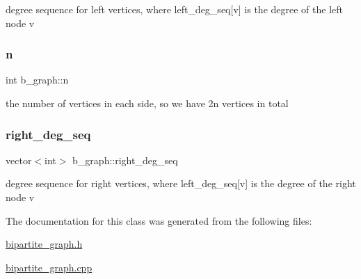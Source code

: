 degree sequence for left vertices, where left\+\_\+deg\+\_\+seq\mbox{[}v\mbox{]} is the degree of the left node v 

\mbox{\label{classb__graph_a9e211d40c1799bc9b125de472ff06642}} 
\subsubsection{\texorpdfstring{n}{n}}
{\footnotesize\ttfamily int b\+\_\+graph\+::n\hspace{0.3cm}{\ttfamily [private]}}



the number of vertices in each side, so we have 2n vertices in total 

\mbox{\label{classb__graph_ae4c875ed6a583a78f38dfe958f20fad5}} 
\subsubsection{\texorpdfstring{right\+\_\+deg\+\_\+seq}{right\_deg\_seq}}
{\footnotesize\ttfamily vector$<$int$>$ b\+\_\+graph\+::right\+\_\+deg\+\_\+seq\hspace{0.3cm}{\ttfamily [private]}}



degree sequence for right vertices, where left\+\_\+deg\+\_\+seq\mbox{[}v\mbox{]} is the degree of the right node v 



The documentation for this class was generated from the following files\+:\begin{DoxyCompactItemize}
\item 
\hyperlink{bipartite__graph_8h}{bipartite\+\_\+graph.\+h}\item 
\hyperlink{bipartite__graph_8cpp}{bipartite\+\_\+graph.\+cpp}\end{DoxyCompactItemize}
